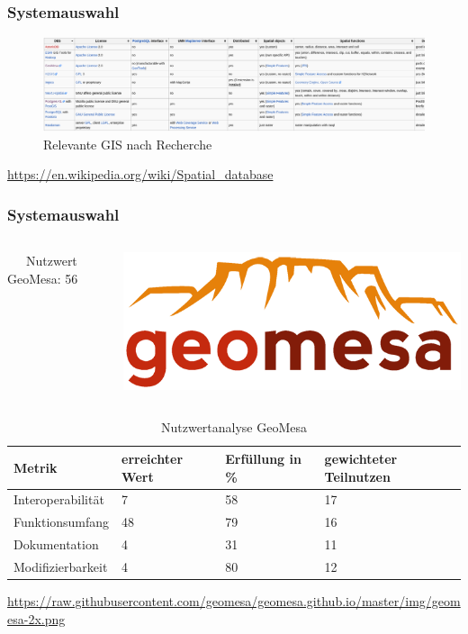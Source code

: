 \documentclass{beamer}
\begin{document}
\begin{frame}\frametitle{Systemauswahl}
\begin{figure}
\centering
\includegraphics[height=.7\vsize]{spatial_databases3.png}
\caption{Relevante GIS nach Recherche}
\end{figure}
\begin{center}
\tiny
\url{https://en.wikipedia.org/wiki/Spatial_database}
\end{center}
\end{frame}

\begin{frame}\frametitle{Systemauswahl}

   \begin{columns}
    \begin{column}{.5\textwidth}
\ \ \ Nutzwert GeoMesa: 56
    \end{column}
    \begin{column}{.5\textwidth}
    \includegraphics[width=.7\hsize]{geomesa.png}
    \end{column}
  \end{columns}

\begin{table}
\begin{tabular}{|l|p{1.8cm}|l|p{1.9cm}|}
\hline
\textbf{Metrik} & \textbf{erreichter Wert} & \textbf{Erfüllung in \%} & \textbf{gewichteter Teilnutzen} \\ \hline
Interoperabilität & 7 & 58 & 17 \\ \hline
Funktionsumfang & 48 & 79 & 16 \\ \hline
Dokumentation & 4 & 31 & 11 \\ \hline
Modifizierbarkeit & 4 & 80 & 12 \\ \hline
\end{tabular}
\caption{Nutzwertanalyse GeoMesa}
\end{table}

\begin{center}
\tiny
\url{https://raw.githubusercontent.com/geomesa/geomesa.github.io/master/img/geomesa-2x.png}
\end{center}

\end{frame}
\end{document}

